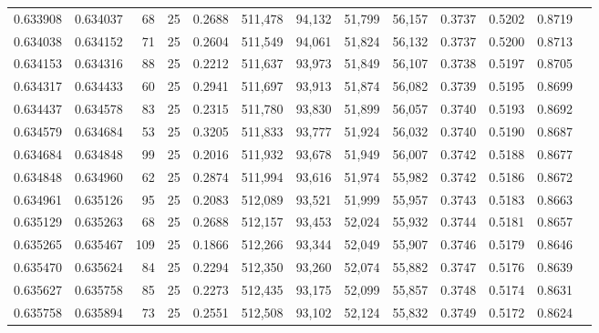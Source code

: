 \begin{tabular}{rrrrrrrrrrrrr}
0.633908 & 0.634037 &    68 &  25 &                                     0.2688 & 511,478 &  94,132 &  51,799 &  56,157 & 0.3737 & 0.5202 & 0.8719 \\
0.634038 & 0.634152 &    71 &  25 &                                     0.2604 & 511,549 &  94,061 &  51,824 &  56,132 & 0.3737 & 0.5200 & 0.8713 \\
0.634153 & 0.634316 &    88 &  25 &                                     0.2212 & 511,637 &  93,973 &  51,849 &  56,107 & 0.3738 & 0.5197 & 0.8705 \\
0.634317 & 0.634433 &    60 &  25 &                                     0.2941 & 511,697 &  93,913 &  51,874 &  56,082 & 0.3739 & 0.5195 & 0.8699 \\
0.634437 & 0.634578 &    83 &  25 &                                     0.2315 & 511,780 &  93,830 &  51,899 &  56,057 & 0.3740 & 0.5193 & 0.8692 \\
0.634579 & 0.634684 &    53 &  25 &                                     0.3205 & 511,833 &  93,777 &  51,924 &  56,032 & 0.3740 & 0.5190 & 0.8687 \\
0.634684 & 0.634848 &    99 &  25 &                                     0.2016 & 511,932 &  93,678 &  51,949 &  56,007 & 0.3742 & 0.5188 & 0.8677 \\
0.634848 & 0.634960 &    62 &  25 &                                     0.2874 & 511,994 &  93,616 &  51,974 &  55,982 & 0.3742 & 0.5186 & 0.8672 \\
0.634961 & 0.635126 &    95 &  25 &                                     0.2083 & 512,089 &  93,521 &  51,999 &  55,957 & 0.3743 & 0.5183 & 0.8663 \\
0.635129 & 0.635263 &    68 &  25 &                                     0.2688 & 512,157 &  93,453 &  52,024 &  55,932 & 0.3744 & 0.5181 & 0.8657 \\
0.635265 & 0.635467 &   109 &  25 &                                     0.1866 & 512,266 &  93,344 &  52,049 &  55,907 & 0.3746 & 0.5179 & 0.8646 \\
0.635470 & 0.635624 &    84 &  25 &                                     0.2294 & 512,350 &  93,260 &  52,074 &  55,882 & 0.3747 & 0.5176 & 0.8639 \\
0.635627 & 0.635758 &    85 &  25 &                                     0.2273 & 512,435 &  93,175 &  52,099 &  55,857 & 0.3748 & 0.5174 & 0.8631 \\
0.635758 & 0.635894 &    73 &  25 &                                     0.2551 & 512,508 &  93,102 &  52,124 &  55,832 & 0.3749 & 0.5172 & 0.8624 \\

\end{tabular}
